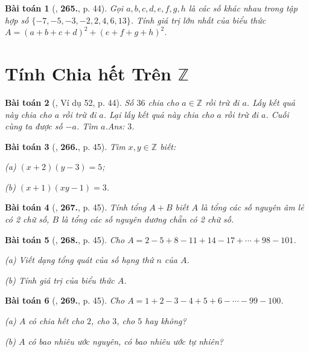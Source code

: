 \documentclass{article}
\numberwithin{equation}{section}
\newtheorem{baitoan}{Bài toán}
\begin{document}
\begin{baitoan}[\cite{Binh_Toan_6_tap_1}, \textbf{265.}, p. 44]
	Gọi $a,b,c,d,e,f,g,h$ là các số khác nhau trong tập hợp số $\{-7,-5,-3,-2,2,4,6,13\}$. Tính giá trị lớn nhất của biểu thức $A = (a + b + c + d)^2 + (e + f + g + h)^2$.
\end{baitoan}


\section{Tính Chia hết Trên $\mathbb{Z}$}

\begin{baitoan}[\cite{Binh_Toan_6_tap_1}, Ví dụ 52, p. 44]
	Số $36$ chia cho $a\in\mathbb{Z}$ rồi trừ đi $a$. Lấy kết quả này chia cho $a$ rồi trừ đi $a$. Lại lấy kết quả này chia cho $a$ rồi trừ đi $a$. Cuối cùng ta được số $-a$. Tìm $a$.\hfill\textsf{Ans:} $3$.
\end{baitoan}

\begin{baitoan}[\cite{Binh_Toan_6_tap_1}, \textbf{266.}, p. 45]
	Tìm $x,y\in\mathbb{Z}$ biết:
	\begin{enumerate*}
		\item[(a)] $(x + 2)(y - 3) = 5$;
		\item[(b)] $(x + 1)(xy - 1) = 3$.
	\end{enumerate*}
\end{baitoan}

\begin{baitoan}[\cite{Binh_Toan_6_tap_1}, \textbf{267.}, p. 45]
	Tính tổng $A + B$ biết $A$ là tổng các số nguyên âm lẻ có 2 chữ số, $B$ là tổng các số nguyên dương chẵn có 2 chữ số.
\end{baitoan}

\begin{baitoan}[\cite{Binh_Toan_6_tap_1}, \textbf{268.}, p. 45]
	Cho $A = 2 - 5 + 8 - 11 + 14 - 17 + \cdots + 98 - 101$.
	\begin{enumerate*}
		\item[(a)] Viết dạng tổng quát của số hạng thứ $n$ của $A$.
		\item[(b)] Tính giá trị của biểu thức $A$.
	\end{enumerate*}
\end{baitoan}

\begin{baitoan}[\cite{Binh_Toan_6_tap_1}, \textbf{269.}, p. 45]
	Cho $A = 1 + 2 - 3 - 4 + 5 + 6 - \cdots - 99 - 100$.
	\begin{enumerate*}
		\item[(a)] $A$ có chia hết cho $2$, cho $3$, cho $5$ hay không?
		\item[(b)] $A$ có bao nhiêu ước nguyên, có bao nhiêu ước tự nhiên?
	\end{enumerate*}
\end{baitoan}
\end{document}
